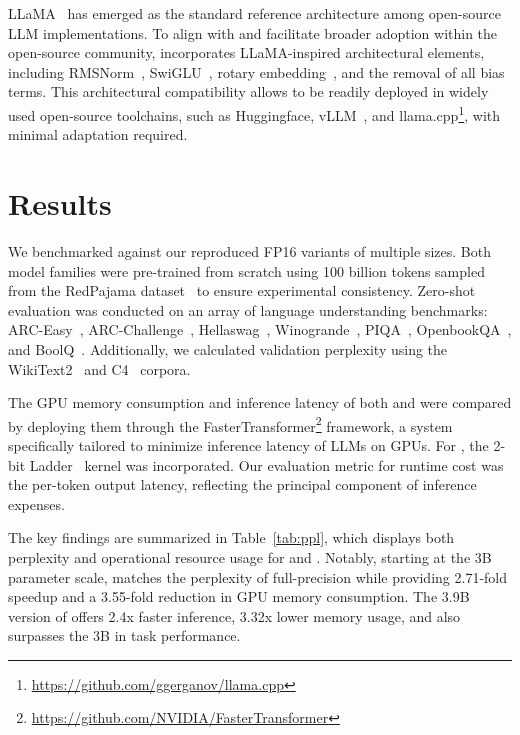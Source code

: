 LLaMA~\cite{llama, llama2} has emerged as the standard reference architecture among open-source LLM implementations. To align with and facilitate broader adoption within the open-source community,  incorporates LLaMA-inspired architectural elements, including RMSNorm~\cite{rmsnorm}, SwiGLU~\cite{swiglu}, rotary embedding~\cite{rope}, and the removal of all bias terms. This architectural compatibility allows  to be readily deployed in widely used open-source toolchains, such as Huggingface, vLLM~\cite{vllm}, and llama.cpp\footnote{\url{https://github.com/ggerganov/llama.cpp}}, with minimal adaptation required.

\section{Results}

We benchmarked  against our reproduced FP16  variants of multiple sizes. Both model families were pre-trained from scratch using 100 billion tokens sampled from the RedPajama dataset~\cite{redpajama} to ensure experimental consistency. Zero-shot evaluation was conducted on an array of language understanding benchmarks: ARC-Easy~\cite{arc}, ARC-Challenge~\cite{arc}, Hellaswag~\cite{hellaswag}, Winogrande~\cite{winoGrande}, PIQA~\cite{piqa}, OpenbookQA~\cite{openbookqa}, and BoolQ~\cite{boolq}. Additionally, we calculated validation perplexity using the WikiText2~\cite{wikitext2} and C4~\cite{c4} corpora.

The GPU memory consumption and inference latency of both  and  were compared by deploying them through the FasterTransformer\footnote{\url{https://github.com/NVIDIA/FasterTransformer}} framework, a system specifically tailored to minimize inference latency of LLMs on GPUs. For , the 2-bit Ladder~\cite{ladder} kernel was incorporated. Our evaluation metric for runtime cost was the per-token output latency, reflecting the principal component of inference expenses.

The key findings are summarized in Table~\ref{tab:ppl}, which displays both perplexity and operational resource usage for  and . Notably, starting at the 3B parameter scale,  matches the perplexity of full-precision  while providing 2.71-fold speedup and a 3.55-fold reduction in GPU memory consumption. The 3.9B version of  offers 2.4x faster inference, 3.32x lower memory usage, and also surpasses the 3B  in task performance.

